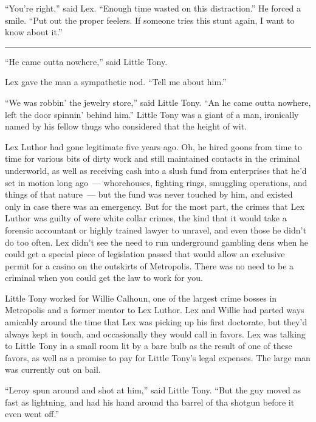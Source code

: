 \documentclass[ebook,12pt]{memoir}
\begin{document}
``You're right,'' said Lex. ``Enough time wasted on this distraction.''
He forced a smile. ``Put out the proper feelers. If someone tries this
stunt again, I want to know about it.''

\begin{center}\rule{0.5\linewidth}{\linethickness}\end{center}

``He came outta nowhere,'' said Little Tony.

Lex gave the man a sympathetic nod. ``Tell me about him.''

``We was robbin' the jewelry store,'' said Little Tony. ``An he came
outta nowhere, left the door spinnin' behind him.'' Little Tony was a
giant of a man, ironically named by his fellow thugs who considered that
the height of wit.

Lex Luthor had gone legitimate five years ago. Oh, he hired goons from
time to time for various bits of dirty work and still maintained
contacts in the criminal underworld, as well as receiving cash into a
slush fund from enterprises that he'd set in motion long ago~---
whorehouses, fighting rings, smuggling operations, and things of that
nature~--- but the fund was never touched by him, and existed only in
case there was an emergency. But for the most part, the crimes that Lex
Luthor was guilty of were white collar crimes, the kind that it would
take a forensic accountant or highly trained lawyer to unravel, and even
those he didn't do too often. Lex didn't see the need to run underground
gambling dens when he could get a special piece of legislation passed
that would allow an exclusive permit for a casino on the outskirts of
Metropolis. There was no need to be a criminal when you could get the
law to work for you.

Little Tony worked for Willie Calhoun, one of the largest crime bosses
in Metropolis and a former mentor to Lex Luthor. Lex and Willie had
parted ways amicably around the time that Lex was picking up his first
doctorate, but they'd always kept in touch, and occasionally they would
call in favors. Lex was talking to Little Tony in a small room lit by a
bare bulb as the result of one of these favors, as well as a promise to
pay for Little Tony's legal expenses. The large man was currently out on
bail.

``Leroy spun around and shot at him,'' said Little Tony. ``But the guy
moved as fast as lightning, and had his hand around tha barrel of tha
shotgun before it even went off.''
\end{document}
